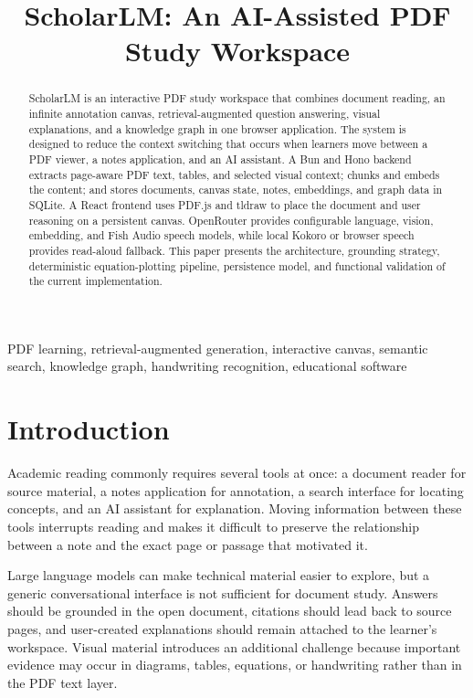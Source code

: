 \documentclass[conference]{IEEEtran}
\title{ScholarLM: An AI-Assisted PDF Study Workspace}
\author{\IEEEauthorblockN{T Aditya Ananda Sai}
\IEEEauthorblockA{Term-3 Project Report\\
Indian Institute of Technology Guwahati\\
taa.sai@op.iitg.ac.in}}
\begin{document}
\maketitle

\begin{abstract}
ScholarLM is an interactive PDF study workspace that combines document reading, an infinite annotation canvas, retrieval-augmented question answering, visual explanations, and a knowledge graph in one browser application. The system is designed to reduce the context switching that occurs when learners move between a PDF viewer, a notes application, and an AI assistant. A Bun and Hono backend extracts page-aware PDF text, tables, and selected visual context; chunks and embeds the content; and stores documents, canvas state, notes, embeddings, and graph data in SQLite. A React frontend uses PDF.js and tldraw to place the document and user reasoning on a persistent canvas. OpenRouter provides configurable language, vision, embedding, and Fish Audio speech models, while local Kokoro or browser speech provides read-aloud fallback. This paper presents the architecture, grounding strategy, deterministic equation-plotting pipeline, persistence model, and functional validation of the current implementation.
\end{abstract}

\begin{IEEEkeywords}
PDF learning, retrieval-augmented generation, interactive canvas, semantic search, knowledge graph, handwriting recognition, educational software
\end{IEEEkeywords}

\section{Introduction}
Academic reading commonly requires several tools at once: a document reader for source material, a notes application for annotation, a search interface for locating concepts, and an AI assistant for explanation. Moving information between these tools interrupts reading and makes it difficult to preserve the relationship between a note and the exact page or passage that motivated it.

Large language models can make technical material easier to explore, but a generic conversational interface is not sufficient for document study. Answers should be grounded in the open document, citations should lead back to source pages, and user-created explanations should remain attached to the learner's workspace. Visual material introduces an additional challenge because important evidence may occur in diagrams, tables, equations, or handwriting rather than in the PDF text layer.
\end{document}
